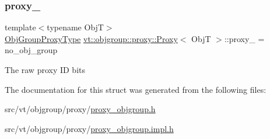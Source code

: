 \subsubsection{\texorpdfstring{proxy\+\_\+}{proxy\_}}
{\footnotesize\ttfamily template$<$typename ObjT$>$ \\
\hyperlink{namespacevt_ad7cae989df485fccca57f0792a880a8e}{Obj\+Group\+Proxy\+Type} \hyperlink{structvt_1_1objgroup_1_1proxy_1_1_proxy}{vt\+::objgroup\+::proxy\+::\+Proxy}$<$ ObjT $>$\+::proxy\+\_\+ = no\+\_\+obj\+\_\+group\hspace{0.3cm}{\ttfamily [private]}}

The raw proxy ID bits 

The documentation for this struct was generated from the following files\+:\begin{DoxyCompactItemize}
\item 
src/vt/objgroup/proxy/\hyperlink{proxy__objgroup_8h}{proxy\+\_\+objgroup.\+h}\item 
src/vt/objgroup/proxy/\hyperlink{proxy__objgroup_8impl_8h}{proxy\+\_\+objgroup.\+impl.\+h}\end{DoxyCompactItemize}
